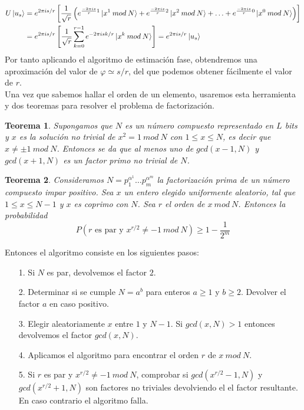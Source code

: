 \documentclass[a4paper]{article}
\newtheorem{teo}{Teorema}[section]
\numberwithin{equation}{section}
\newcommand{\modd}{\: mod \:}
\begin{document}
\begin{equation}
\begin{split}
U\ket{u_s} &=
e^{2\pi is/r} \left[
\frac{1}{\sqrt{r}} \left(
e^{\frac{-2\pi is}{r}1} \ket{x^1 \modd N} +
e^{\frac{-2\pi is}{r}2} \ket{x^2 \modd N} + \ldots +
e^{\frac{-2\pi is}{r}0} \ket{x^0 \modd N} \right) \right]
\\ &=
e^{2\pi is/r} \left[ \frac{1}{\sqrt{r}} \sum_{k=0}^{r-1} e^{-2\pi isk/r}\ket{x^k \modd N} \right]
= e^{2\pi is/r} \ket{u_s}
\end{split}
\end{equation}
Por tanto aplicando el algoritmo de estimación fase, obtendremos una aproximación del valor de $\varphi \simeq s/r$, del que podemos obtener fácilmente el valor de $r$.\\

Una vez que sabemos hallar el orden de un elemento, usaremos esta herramienta y dos teoremas para resolver el problema de factorización.

\begin{teo}
Supongamos que $N$ es un número compuesto representado en $L$ bits y $x$ es la solución no trivial de $x^2 = 1 \modd N$ con $1\leq x\leq N$, es decir que $x \neq \pm 1 \modd N$. Entonces se da que al menos uno de $gcd(x-1, N)$ y $gcd(x+1, N)$ es un factor primo no trivial de $N$.
\end{teo}

\begin{teo}
Consideramos $N = p_{1}^{\alpha^1}\ldots p_{m}^{\alpha^m}$ la factorización prima de un número compuesto impar positivo. Sea $x$ un entero elegido uniformente aleatorio, tal que $1 \leq x \leq N-1$ y $x$ es coprimo con $N$. Sea $r$ el orden de $x \modd N$. Entonces la probabilidad
\begin{equation}
P(r \text{ es par y } x^{r/2} \neq -1 \modd N) \geq 1 - \frac{1}{2^m}
\end{equation}
\end{teo}
Entonces el algoritmo consiste en los siguientes pasos:
\begin{itemize}
\item[1.]Si $N$ es par, devolvemos el factor $2$.

\item[2.]Determinar si se cumple $N = a^b$ para enteros $a\geq 1$ y $b \geq 2$. Devolver el factor $a$ en caso positivo.

\item[3.]Elegir aleatoriamente $x$ entre $1$ y $N-1$. Si $gcd(x,N)>1$ entonces devolvemos el factor $gcd(x,N)$.

\item[4.]Aplicamos el algoritmo para encontrar el orden $r$ de $x \modd N$.

\item[5.]Si $r$ es par y $x^{r/2}\neq -1 \modd N$, comprobar si $gcd(x^{r/2}-1, N)$ y $gcd(x^{r/2}+1, N)$ son factores no triviales devolviendo el el factor resultante. En caso contrario el algoritmo falla.
\end{itemize}
\end{document}
